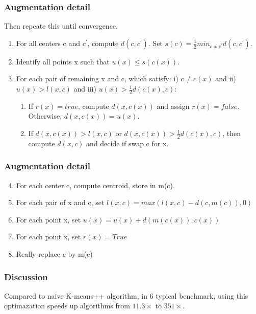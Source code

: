 \documentclass[9pt]{beamer}
\newcommand{\ccp}[1]{{\color{purple}#1}}
\begin{document}
\begin{frame}
	\frametitle{Augmentation detail}

	Then repeate this until convergence.
	\begin{enumerate}
		\item For all centers c and $c^{\prime}$, compute $d(c, c^{\prime})$. Set $s(c) = \frac{1}{2}min_{c \ne c^{\prime}}d(c,c^{\prime})$.
		\item \ccp{Identify all points x such that $u(x) \le s(c(x))$. }
		\item For each pair of remaining x and c, which satisfy: i) $c \ne c(x)$ and ii) $u(x) > l(x,c)$ and \ccp{iii) $u(x) > \frac{1}{2}d(c(x), c)$}:
		      \begin{enumerate}
			      \item If $r(x) = true$, compute $d(x,c(x))$ and assign $r(x)=false$. \ccp{Otherwise, $d(x,c(x)) = u(x).$ }
			      \item \ccp{If $d(x,c(x))> l(x,c)$ or $d(x,c(x)) > \frac{1}{2}d(c(x), c)$}, then compute $d(x,c)$ and decide if swap c for x.
		      \end{enumerate}

	\end{enumerate}
\end{frame}

\begin{frame}
	\frametitle{Augmentation detail}
	\begin{enumerate}
		\setcounter{enumi}{3}
		\item For each center c, compute centroid, store in m(c).
		\item For each  pair of x and c, set $l(x,c) = max(l(x,c) - d(c,m(c)), 0)$
		\item For each point x, set $u(x) = u(x) + d(m(c(x)), c(x))$
		\item For each point x, set $r(x) = True$
		\item Really replace c by m(c)
	\end{enumerate}
\end{frame}

\begin{frame}
	\frametitle{Discussion}
	Compared to naive K-means++ algorithm, in 6 typical benchmark, using this optimazation speeds up algorithms from $ 11.3 \times$ to $  351 \times$.
\end{frame}
\end{document}
